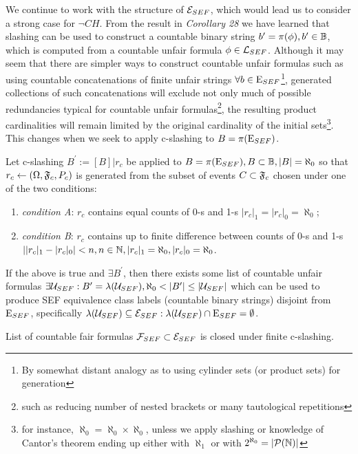 We continue to work with the structure of $\mathcal{E}_{SEF}$, which would lead us to consider a strong case for $\neg CH$. From the result in \textit{Corollary 28} we have learned that slashing can be used to construct a countable binary string $b^\prime = \pi(\phi), b^\prime \in \mathbb{B}$, which is computed from a countable unfair formula $\phi \in \mathcal{L}_{SEF}$. Although it may seem that there are simpler ways to construct countable unfair formulas such as using countable concatenations of finite unfair strings $\forall b \in \mathrm{E}_{SEF}$\footnote{By somewhat distant analogy as to using cylinder sets (or product sets) for generation}, generated collections of such concatenations will exclude not only much of possible redundancies typical for countable unfair formulas\footnote{such as reducing number of nested brackets or many tautological repetitions}, the resulting product cardinalities will remain limited by the original cardinality of the initial sets\footnote{for instance, $\aleph_0 = \aleph_0 \times \aleph_0$, unless we apply slashing or knowledge of Cantor's theorem ending up either with $\aleph_1$ or with $2^{\aleph_0} = |\mathcal{P}(\mathbb{N})|$}. This changes when we seek to apply c-slashing to $B = \pi(\mathrm{E}_{SEF})$.

\begin{theorem}
  Let c-slashing $B^\prime := [B]|r_c$ be applied to $B = \pi(\mathrm{E}_{SEF}), B \subset \mathbb{B}, |B| = \aleph_0$ so that $r_c \leftarrow (\Omega,\mathfrak{F}_c,P_c)$ is generated from the subset of events $C \subset \mathfrak{F}_c$ chosen under one of the two conditions:
  \begin{enumerate}
    \item \textit{condition A}: $r_c$ contains equal counts of 0-s and 1-s $|r_c|_1 = |r_c|_0 = \aleph_0$;
    \item \textit{condition B}: $r_c$ contains up to finite difference between counts of 0-s and 1-s $| |r_c|_1 - |r_c|_0 | < n, n \in \mathbb{N}, |r_c|_1 = \aleph_0, |r_c|_0 = \aleph_0$.
  \end{enumerate}
  If the above is true and $\exists B^\prime$, then there exists some list of countable unfair formulas $\exists \mathcal{U}_{SEF}: B^\prime = \lambda(\mathcal{U}_{SEF}), \aleph_0 < |B^\prime| \leq |\mathcal{U}_{SEF}|$ which can be used to produce SEF equivalence class labels (countable binary strings) disjoint from $\mathrm{E}_{SEF}$, specifically $\lambda(\mathcal{U}_{SEF}) \subseteq \mathcal{E}_{SEF}: \lambda(\mathcal{U}_{SEF}) \cap \mathrm{E}_{SEF} = \emptyset$.
\end{theorem}

\begin{theorem}
  List of countable fair formulas $\mathcal{F}_{SEF} \subset \mathcal{E}_{SEF}$ is closed under finite c-slashing.
\end{theorem}

